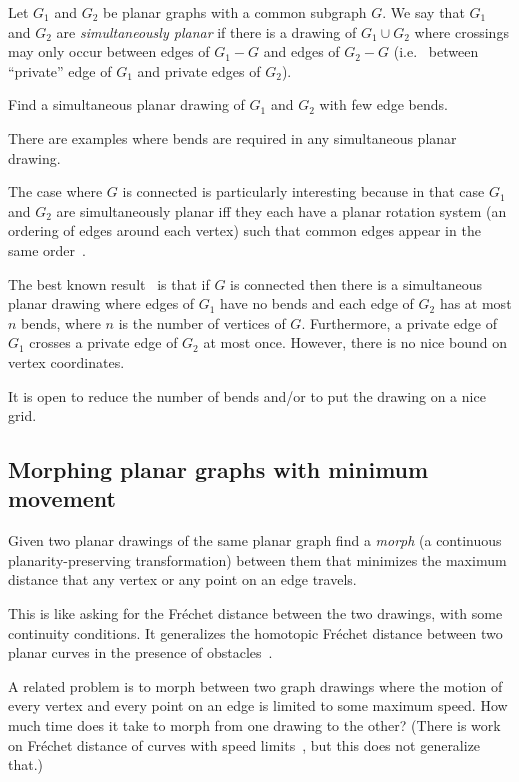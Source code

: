 \documentclass{patmorin}
\newcommand{\poser}[1]{\noindent{\textit{#1}}}
\begin{document}
\poser{Anna Lubiw}

Let $G_1$ and $G_2$ be planar graphs with a common subgraph $G$.
We say that $G_1$ and $G_2$ are \emph{simultaneously planar} if there
is a drawing of $G_1 \cup G_2$ where crossings may only occur between
edges of $G_1 - G$ and edges of $G_2 - G$ (i.e.~ between ``private''
edge of $G_1$ and private edges of $G_2$).  

\begin{op}
  Find a simultaneous planar drawing of $G_1$ and $G_2$ with few edge
  bends.
\end{op}

There are examples where bends are required in any simultaneous planar
drawing.

The case where $G$ is connected is particularly interesting because
in that case $G_1$ and $G_2$ are simultaneously planar iff they each
have a planar rotation system (an ordering of edges around each vertex)
such that common edges appear in the same order~\cite{Junger-Schulz}.

The best known result~\cite{Haeupler-13} is that if $G$ is connected
then there is a simultaneous planar drawing where edges of $G_1$ have
no bends and each  edge of $G_2$ has at most $n$ bends, where $n$ is
the number of vertices of $G$.  Furthermore, a private edge of $G_1$
crosses a private edge of $G_2$ at most once.  However, there is no nice
bound on vertex coordinates.

It is open to reduce the number of bends and/or to put the drawing on
a nice grid.

\subsection{Morphing planar graphs with minimum movement}

\poser{Anna Lubiw}

\begin{op}
  Given two planar drawings of the same planar graph find a \emph{morph}
  (a continuous planarity-preserving transformation) between them that
  minimizes the maximum distance that any vertex or any point on an
  edge travels.
\end{op}

This is  like asking for  the Fr\'echet distance between the two
drawings, with some continuity conditions.  It generalizes the
homotopic Fr\'echet distance between two planar curves in the presence
of obstacles~\cite{Chambers-10}.

A related problem is to morph between two graph drawings where the
motion of every vertex and every point on an edge is limited to some
maximum speed.  How much time does it take to morph from one drawing to
the other?  (There is work on Fr\'echet distance of curves with speed
limits~\cite{Maheshwari-11}, but this does not generalize that.)
\end{document}
